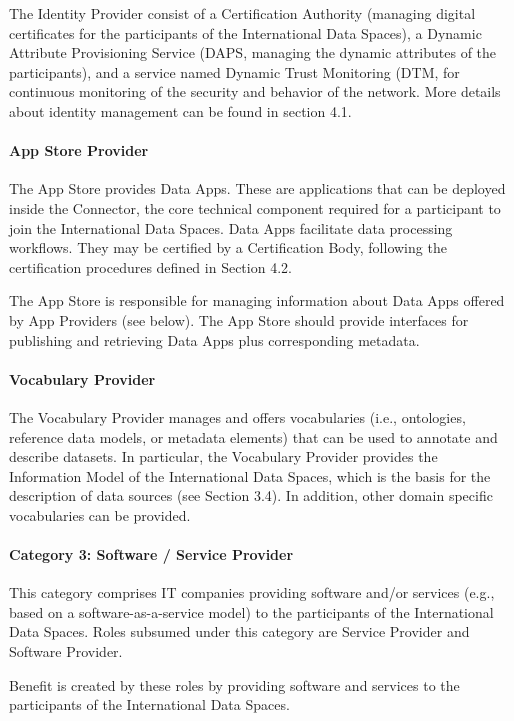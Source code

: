 The Identity Provider consist of a Certification Authority (managing digital certificates for the participants of the International Data Spaces), a Dynamic Attribute Provisioning Service (DAPS, managing the dynamic attributes of the participants), and a service named Dynamic Trust Monitoring (DTM, for continuous monitoring of the security and behavior of the network. More details about identity management can be found in section 4.1. %

\paragraph{App Store Provider}
The App Store provides Data Apps. These are applications that can be deployed inside the Connector, the core technical component required for a participant to join the International Data Spaces. Data Apps facilitate data processing workflows. They may be certified by a Certification Body, following the certification procedures defined in Section 4.2. %

The App Store is responsible for managing information about Data Apps offered by App Providers (see below). The App Store should provide interfaces for publishing and retrieving Data Apps plus corresponding metadata.

\paragraph{Vocabulary Provider}
The Vocabulary Provider manages and offers vocabularies (i.e., ontologies, reference data models, or metadata elements) that can be used to annotate and describe datasets. In particular, the Vocabulary Provider provides the Information Model of the International Data Spaces, which is the basis for the description of data sources (see Section 3.4). In addition, other domain specific vocabularies can be provided. %

\paragraph{Category 3: Software / Service Provider}
This category comprises IT companies providing software and/or services (e.g., based on a software-as-a-service model) to the participants of the International Data Spaces. Roles subsumed under this category are Service Provider and Software Provider.

Benefit is created by these roles by providing software and services to the participants of the International Data Spaces. 

